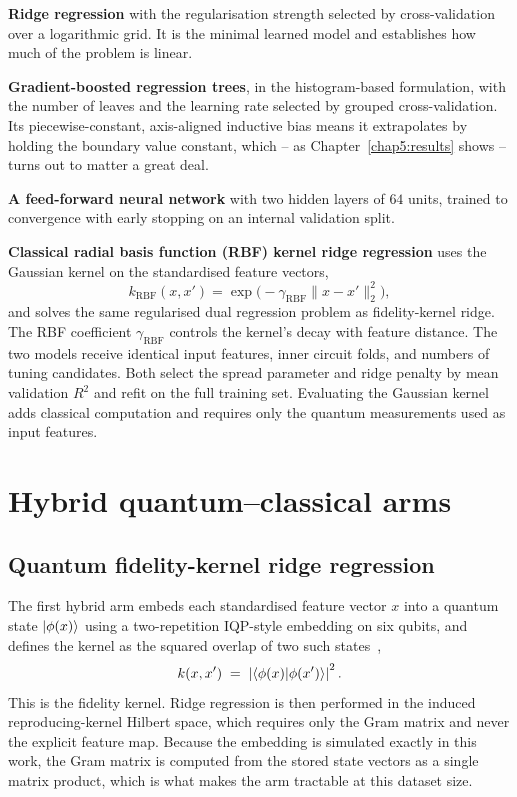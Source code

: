 \documentclass[Thesis.tex]{subfiles}
\begin{document}
\textbf{Ridge regression} with the regularisation strength selected by
cross-validation over a logarithmic grid. It is the minimal learned model and
establishes how much of the problem is linear.

\textbf{Gradient-boosted regression trees}, in the histogram-based formulation, with
the number of leaves and the learning rate selected by grouped cross-validation. Its
piecewise-constant, axis-aligned inductive bias means it extrapolates by holding the
boundary value constant, which -- as Chapter~\ref{chap5:results} shows -- turns out
to matter a great deal.

\textbf{A feed-forward neural network} with two hidden layers of $64$ units,
trained to convergence with early stopping on an internal validation split.

\textbf{Classical radial basis function (RBF) kernel ridge regression} uses
the Gaussian kernel on the standardised feature vectors,
\begin{equation}
    k_\mathrm{RBF}(x,x') = \exp\!\bigl(-\gamma_{\mathrm{RBF}} \lVert x-x'\rVert_2^2\bigr),
    \label{eq:ch3_rbf}
\end{equation}
and solves the same regularised dual regression problem as fidelity-kernel ridge.
The RBF coefficient $\gamma_{\mathrm{RBF}}$ controls the kernel's decay with feature distance.
The two models receive identical input features, inner circuit folds, and numbers
of tuning candidates. Both select the spread parameter and ridge penalty by mean
validation $R^2$ and refit on the full training set. Evaluating the Gaussian kernel
adds classical computation and requires only the quantum measurements used as
input features.

\section{Hybrid quantum--classical arms}\label{sec:ch3_hybrid}

\subsection{Quantum fidelity-kernel ridge regression}

The first hybrid arm embeds each standardised feature vector $x$ into a quantum state
$\ket{\phi(x)}$ using a two-repetition IQP-style embedding on six qubits, and defines
the kernel as the squared overlap of two such
states~\cite{havlicek2019supervised,schuld2021kernel},
\begin{equation}
    k(x, x') \;=\; \left| \braket{\phi(x) | \phi(x')} \right|^2 .
    \label{eq:ch3_fidelity}
\end{equation}
This is the fidelity kernel. Ridge regression is then performed in the induced
reproducing-kernel Hilbert space, which requires only the Gram matrix and never the
explicit feature map. Because the embedding is simulated exactly in this work, the
Gram matrix is computed from the stored state vectors as a single matrix product,
which is what makes the arm tractable at this dataset size.
\end{document}
